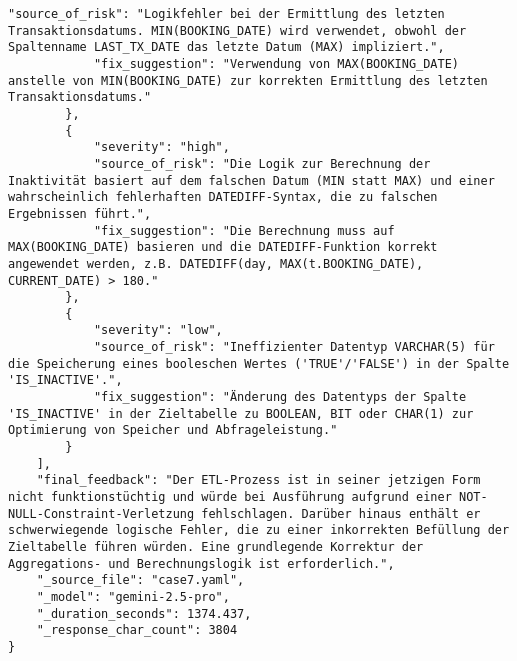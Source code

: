 \begin{lstlisting}[caption={Ausgabe: GEMINI 2.5 Pro Anwendungsfall 7 Hauptdurchlauf},label={gemini_case7_prompt1}]
            "source_of_risk": "Logikfehler bei der Ermittlung des letzten Transaktionsdatums. MIN(BOOKING_DATE) wird verwendet, obwohl der Spaltenname LAST_TX_DATE das letzte Datum (MAX) impliziert.",
            "fix_suggestion": "Verwendung von MAX(BOOKING_DATE) anstelle von MIN(BOOKING_DATE) zur korrekten Ermittlung des letzten Transaktionsdatums."
        },
        {
            "severity": "high",
            "source_of_risk": "Die Logik zur Berechnung der Inaktivität basiert auf dem falschen Datum (MIN statt MAX) und einer wahrscheinlich fehlerhaften DATEDIFF-Syntax, die zu falschen Ergebnissen führt.",
            "fix_suggestion": "Die Berechnung muss auf MAX(BOOKING_DATE) basieren und die DATEDIFF-Funktion korrekt angewendet werden, z.B. DATEDIFF(day, MAX(t.BOOKING_DATE), CURRENT_DATE) > 180."
        },
        {
            "severity": "low",
            "source_of_risk": "Ineffizienter Datentyp VARCHAR(5) für die Speicherung eines booleschen Wertes ('TRUE'/'FALSE') in der Spalte 'IS_INACTIVE'.",
            "fix_suggestion": "Änderung des Datentyps der Spalte 'IS_INACTIVE' in der Zieltabelle zu BOOLEAN, BIT oder CHAR(1) zur Optimierung von Speicher und Abfrageleistung."
        }
    ],
    "final_feedback": "Der ETL-Prozess ist in seiner jetzigen Form nicht funktionstüchtig und würde bei Ausführung aufgrund einer NOT-NULL-Constraint-Verletzung fehlschlagen. Darüber hinaus enthält er schwerwiegende logische Fehler, die zu einer inkorrekten Befüllung der Zieltabelle führen würden. Eine grundlegende Korrektur der Aggregations- und Berechnungslogik ist erforderlich.",
    "_source_file": "case7.yaml",
    "_model": "gemini-2.5-pro",
    "_duration_seconds": 1374.437,
    "_response_char_count": 3804
}
\end{lstlisting}

